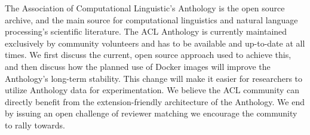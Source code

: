 The Association of Computational Linguistic's Anthology is the open  source archive, and the main source for computational linguistics  and natural language processing's scientific literature.  The ACL  Anthology is currently maintained exclusively by community  volunteers and has to be available and up-to-date at all times. We  first discuss the current, open source approach used to achieve  this, and then discuss how the planned use of Docker images will  improve the Anthology's long-term stability.  This change will make  it easier for researchers to utilize Anthology data for  experimentation.  We believe the ACL community can directly benefit  from the extension-friendly architecture of the Anthology.  We end  by issuing an open challenge of reviewer matching we encourage the community to rally towards.
